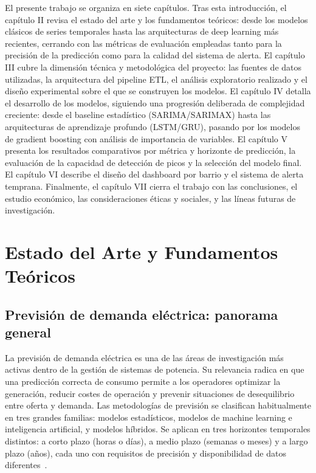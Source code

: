 \documentclass[12pt, a4paper]{article}
\begin{document}
El presente trabajo se organiza en siete capítulos. Tras esta introducción, el capítulo II revisa el estado del arte y los fundamentos teóricos: desde los modelos clásicos de series temporales hasta las arquitecturas de deep learning más recientes, cerrando con las métricas de evaluación empleadas tanto para la precisión de la predicción como para la calidad del sistema de alerta. El capítulo III cubre la dimensión técnica y metodológica del proyecto: las fuentes de datos utilizadas, la arquitectura del pipeline ETL, el análisis exploratorio realizado y el diseño experimental sobre el que se construyen los modelos. El capítulo IV detalla el desarrollo de los modelos, siguiendo una progresión deliberada de complejidad creciente: desde el baseline estadístico (SARIMA/SARIMAX) hasta las arquitecturas de aprendizaje profundo (LSTM/GRU), pasando por los modelos de gradient boosting con análisis de importancia de variables. El capítulo V presenta los resultados comparativos por métrica y horizonte de predicción, la evaluación de la capacidad de detección de picos y la selección del modelo final. El capítulo VI describe el diseño del dashboard por barrio y el sistema de alerta temprana. Finalmente, el capítulo VII cierra el trabajo con las conclusiones, el estudio económico, las consideraciones éticas y sociales, y las líneas futuras de investigación.

\section{Estado del Arte y Fundamentos Teóricos}


\subsection{Previsión de demanda eléctrica: panorama general}


La previsión de demanda eléctrica es una de las áreas de investigación más activas dentro de la gestión de sistemas de potencia. Su relevancia radica en que una predicción correcta de consumo permite a los operadores optimizar la generación, reducir costes de operación y prevenir situaciones de desequilibrio entre oferta y demanda. Las metodologías de previsión se clasifican habitualmente en tres grandes familias: modelos estadísticos, modelos de machine learning e inteligencia artificial, y modelos híbridos. Se aplican en tres horizontes temporales distintos: a corto plazo (horas o días), a medio plazo (semanas o meses) y a largo plazo (años), cada uno con requisitos de precisión y disponibilidad de datos diferentes~\cite{ugbehe2025}.
\end{document}
